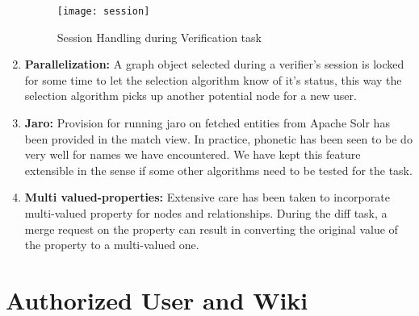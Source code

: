 \begin{enumerate}
\begin{figure}[H]
\begin{center}  
\texttt{[image: session]} 
\caption{Session Handling during Verification task}
\label{fig:session}
\end{center}
\end{figure}


\item \textbf{Parallelization:} A graph object selected during a verifier's session is locked for some time to let the selection algorithm know of it's status, this way the selection algorithm picks up another potential node for a new user.

\item \textbf{Jaro:} Provision for running jaro on fetched entities from Apache Solr has been provided in the match view. In practice, phonetic has been seen to be do very well for names we have encountered. We have kept this feature extensible in the sense if some other algorithms need to be tested for the task.

\item \textbf{Multi valued-properties:} Extensive care has been taken to incorporate multi-valued property for nodes and relationships. During the diff task, a merge request on the property can result in converting the original value of the property to a multi-valued one. 

\end{enumerate}





 

\section{Authorized User and Wiki}


